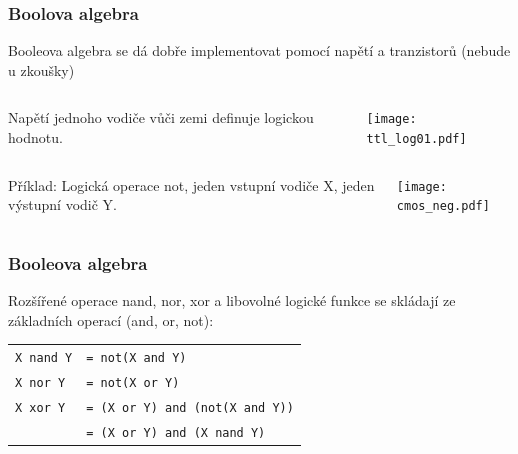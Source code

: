 \documentclass{beamer}
\begin{document}
\begin{frame}
\frametitle{Boolova algebra}

Booleova algebra se dá dobře implementovat pomocí napětí a tranzistorů (nebude u zkoušky)

\begin{columns}
\begin{column}{0.45\textwidth}
Napětí jednoho vodiče vůči zemi definuje logickou hodnotu.
\end{column}
\begin{column}{0.55\textwidth}  
\begin{center}
   \texttt{[image: ttl\_log01.pdf]}
\end{center}
\end{column}
\end{columns}

\begin{columns}
\begin{column}{0.45\textwidth}
Příklad: Logická operace not, jeden vstupní vodiče X, jeden výstupní vodič Y.
\end{column}
\begin{column}{0.55\textwidth}  
\begin{center}
   \texttt{[image: cmos\_neg.pdf]}
\end{center}
\end{column}
\end{columns}


\end{frame}

\begin{frame}
\frametitle{Booleova algebra}

Rozšířené operace nand, nor, xor a libovolné logické funkce se skládají ze základních operací (and, or, not):

\begin{tabular}{ll}
\texttt{X nand Y} & \texttt{= not(X and Y)}\\
\texttt{X nor Y} & \texttt{= not(X or Y)}\\
\texttt{X xor Y} & \texttt{= (X or Y) and (not(X and Y))}\\
& \texttt{= (X or Y) and (X nand Y)}\\
\end{tabular}


\end{frame}
\end{document}
